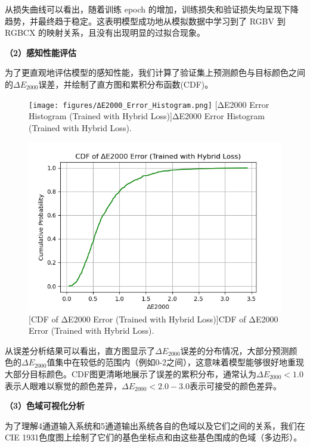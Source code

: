 从损失曲线可以看出，随着训练 epoch 的增加，训练损失和验证损失均呈现下降趋势，并最终趋于稳定。这表明模型成功地从模拟数据中学习到了 RGBV 到 RGBCX 的映射关系，且没有出现明显的过拟合现象。

\noindent\textbf{（2）感知性能评估}

为了更直观地评估模型的感知性能，我们计算了验证集上预测颜色与目标颜色之间的$\Delta E_{2000}$误差，并绘制了直方图和累积分布函数(CDF)。

\begin{figure}[H]
\centering
{}
\texttt{[image: figures/ΔE2000\_Error\_Histogram.png]}
[ΔE2000 Error Histogram (Trained with Hybrid Loss)]{ΔE2000 Error Histogram (Trained with Hybrid Loss).}
\label{figure2: delta_e_histogram}
\end{figure}

\begin{figure}[H]
\centering
{}
\includegraphics[width=0.8\columnwidth]{figures/CDF.png}
[CDF of ΔE2000 Error (Trained with Hybrid Loss)]{CDF of ΔE2000 Error (Trained with Hybrid Loss).}
\label{figure2: delta_e_cdf}
\end{figure}

从误差分析结果可以看出，直方图显示了$\Delta E_{2000}$误差的分布情况，大部分预测颜色的$\Delta E_{2000}$值集中在较低的范围内（例如0-2之间），这意味着模型能够很好地重现大部分目标颜色。CDF图更清晰地展示了误差的累积分布，通常认为$\Delta E_{2000} < 1.0$表示人眼难以察觉的颜色差异，$\Delta E_{2000} < 2.0-3.0$表示可接受的颜色差异。

\noindent\textbf{（3）色域可视化分析}

为了理解4通道输入系统和5通道输出系统各自的色域以及它们之间的关系，我们在CIE 1931色度图上绘制了它们的基色坐标点和由这些基色围成的色域（多边形）。

